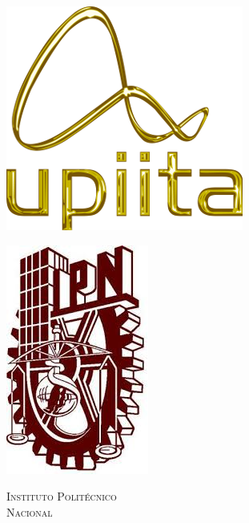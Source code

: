 \documentclass[12pt]{article}
\begin{document}
\newpage	
{}
\begin{center}																		%
\newcommand{\HRule}{\rule{\linewidth}{0.1mm}}									%
\begin{minipage}{0.48\textwidth} \begin{flushleft}
\includegraphics[scale = 0.4]{Imagenes/logo_upiita}
\end{flushleft}\end{minipage}
\begin{minipage}{0.48\textwidth} \begin{flushright}
\includegraphics[scale = 0.25]{Imagenes/IPN}
\end{flushright}\end{minipage}

\vspace*{-1.5cm}								%
\textsc{\huge Instituto Polit\'ecnico\\ \vspace{5px} Nacional}\\[0.8cm]	


\end{center}
\end{document}
